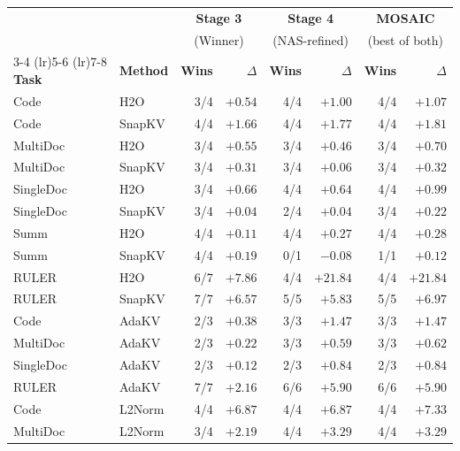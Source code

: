 \begin{tabular}{@{} l l r r r r r r @{}}
  \toprule
  & & \multicolumn{2}{c}{\textbf{Stage 3}} & \multicolumn{2}{c}{\textbf{Stage 4}} & \multicolumn{2}{c}{\textbf{MOSAIC}} \\
  & & \multicolumn{2}{c}{(Winner)} & \multicolumn{2}{c}{(NAS-refined)} & \multicolumn{2}{c}{(best of both)} \\
  \cmidrule(lr){3-4} \cmidrule(lr){5-6} \cmidrule(lr){7-8}
  \textbf{Task} & \textbf{Method} & \textbf{Wins} & \textbf{$\Delta$} & \textbf{Wins} & \textbf{$\Delta$} & \textbf{Wins} & \textbf{$\Delta$} \\
  \midrule
  \rowcolor{gray!10}
  Code      & H2O    & 3/4 & $+0.54$ & 4/4 & $+1.00$ & 4/4 & $+1.07$ \\
  Code      & SnapKV & 4/4 & $+1.66$ & 4/4 & $+1.77$ & 4/4 & $+1.81$ \\
  \rowcolor{gray!10}
  MultiDoc  & H2O    & 3/4 & $+0.55$ & 3/4 & $+0.46$ & 3/4 & $+0.70$ \\
  MultiDoc  & SnapKV & 3/4 & $+0.31$ & 3/4 & $+0.06$ & 3/4 & $+0.32$ \\
  \rowcolor{gray!10}
  SingleDoc & H2O    & 3/4 & $+0.66$ & 4/4 & $+0.64$ & 4/4 & $+0.99$ \\
  SingleDoc & SnapKV & 3/4 & $+0.04$ & 2/4 & $+0.04$ & 3/4 & $+0.22$ \\
  \rowcolor{gray!10}
  Summ      & H2O    & 4/4 & $+0.11$ & 4/4 & $+0.27$ & 4/4 & $+0.28$ \\
  Summ      & SnapKV & 4/4 & $+0.19$ & 0/1 & $-0.08$ & 1/1 & $+0.12$ \\
  \rowcolor{gray!10}
  RULER     & H2O    & 6/7 & $+7.86$ & 4/4 & $+21.84$ & 4/4 & $+21.84$ \\
  RULER     & SnapKV & 7/7 & $+6.57$ & 5/5 & $+5.83$ & 5/5 & $+6.97$ \\
  \midrule
  \rowcolor{gray!10}
  Code      & AdaKV  & 2/3 & $+0.38$ & 3/3 & $+1.47$ & 3/3 & $+1.47$ \\
  MultiDoc  & AdaKV  & 2/3 & $+0.22$ & 3/3 & $+0.59$ & 3/3 & $+0.62$ \\
  \rowcolor{gray!10}
  SingleDoc & AdaKV  & 2/3 & $+0.12$ & 2/3 & $+0.84$ & 2/3 & $+0.84$ \\
  RULER     & AdaKV  & 7/7 & $+2.16$ & 6/6 & $+5.90$ & 6/6 & $+5.90$ \\
  \midrule
  \rowcolor{gray!10}
  Code      & L2Norm & 4/4 & $+6.87$ & 4/4 & $+6.87$ & 4/4 & $+7.33$ \\
  MultiDoc  & L2Norm & 3/4 & $+2.19$ & 4/4 & $+3.29$ & 4/4 & $+3.29$ \\

\end{tabular}
